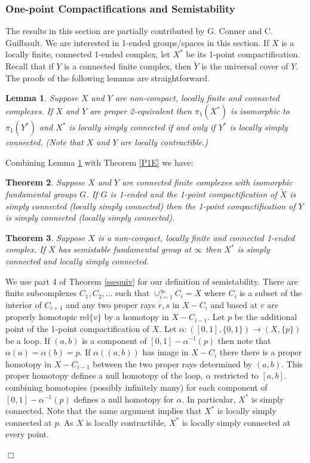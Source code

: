 \documentclass[12pt]{article}
\newtheorem{theorem}{Theorem}[subsection]
\newtheorem{lemma}[theorem]{Lemma}
\newenvironment{proof}{\addvspace{12pt}\noindent{\bf Proof:}}{
$\Box$\par\addvspace{12pt}}
\begin{document}
\subsubsection{One-point Compactifications and Semistability}\label{OnePt}

The results in this section are partially contributed by G. Conner and C. Guilbault. We are interested in 1-ended groups/spaces in this section. If $X$ is a locally finite, connected 1-ended complex, let $X^{\ast}$ be its 1-point compactification.  Recall that if $Y$ is a connected finite complex, then $\tilde Y$ is the universal cover of $Y$. 
The proofs of the following lemmas are straightforward. 

\begin{lemma}\label{OnePt2E}
Suppose $X$ and $Y$ are non-compact, locally finite and connected complexes. If $X$ and $Y$ are proper 2-equivalent then $\pi_1(X^\ast)$ is isomorphic to $\pi_1(Y^\ast)$ and $X^\ast$ is locally simply connected if and only if $Y^\ast$ is locally simply connected. (Note that $X$ and $Y$ are locally contractible.)
\end{lemma}

Combining Lemma \ref{OnePt2E} with Theorem \ref{P1E} we have:
\begin{theorem}
Suppose $X$ and $Y$ are connected finite complexes with isomorphic fundamental groups $G$. If $G$ is 1-ended and the 1-point compactification of $\tilde X$ is simply connected (locally simply connected)  then the 1-point compactification of $Y$ is simply connected (locally simply connected).
\end{theorem}

\begin{theorem} Suppose $X$ is a non-compact, locally finite and connected 1-ended complex. If $X$ has semistable fundamental group at $\infty$ then $X^{\ast}$ is simply connected and locally simply connected.
\end{theorem}
\begin{proof}
We use part 4 of Theorem \ref{ssequiv} for our definition of semistability. There are finite subcomplexes $C_1,C_2,\ldots$ such that $\cup_{i=1}^\infty C_i=X$ where $C_i$ is a subset of the interior of $C_{i+1}$ and any two proper rays $r,s$ in $X-C_i$ and based at $v$ are properly homotopic rel$\{v\}$ by a homotopy in $X-C_{i-1}$.  Let $p$ be the additional point of the 1-point compactification of $X$. Let $\alpha:([0,1],\{0,1\})\to (X,\{p\})$ be a loop. If $(a,b)$ is a component of $[0,1]-\alpha^{-1}(p)$ then note that $\alpha(a)=\alpha(b)=p$. If $\alpha((a,b))$ has image in $X-C_i$ there there is a proper homotopy in $X-C_{i-1}$ between the two proper rays determined by $(a,b)$. This proper homotopy defines a null homotopy of the loop, $\alpha$ restricted to $[a,b]$. combining homotopies (possibly infinitely many) for each component of $[0,1]-\alpha^{-1}(p)$ defines a null homotopy for $\alpha$.  In particular, $X^{\ast}$ is simply connected. Note that the same argument implies that $X^{\ast}$ is locally simply connected at $p$. As $X$ is locally contractible, $X^{\ast}$ is locally simply connected at every point. 
\end{proof}
\end{document}

